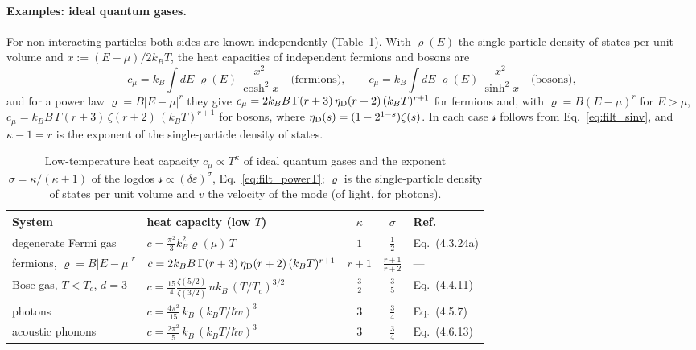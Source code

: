 \documentclass[10pt,a4paper]{article}
\theoremstyle{plain}
\newcommand{\lndos}{{logdos}}  %
\newcommand{\lds}{\mathscr{s}}  %
\newcommand{\etaD}{\eta_{\rm D}}  %
\begin{document}
\paragraph{Examples: ideal quantum gases.} For non-interacting particles
both sides are known independently (Table~\ref{tab:gases}). With
$\varrho(E)$ the single-particle density of states per unit volume and
$x:=(E-\mu)/2k_BT$, the heat capacities of independent fermions and bosons
are
\begin{equation}\label{eq:filt_cF}
  c_\mu=k_B\int dE\;\varrho(E)\,\frac{x^{2}}{\cosh^{2}x}
  \quad\text{(fermions)},
  \qquad
  c_\mu=k_B\int dE\;\varrho(E)\,\frac{x^{2}}{\sinh^{2}x}
  \quad\text{(bosons)},
\end{equation}
and for a power law $\varrho=B|E-\mu|^{r}$ they give
$c_\mu=2k_BB\,\Gamma(r+3)\,\etaD(r+2)\,(k_BT)^{r+1}$ for fermions and, with
$\varrho=B(E-\mu)^{r}$ for $E>\mu$,
$c_\mu=k_BB\,\Gamma(r+3)\,\zeta(r+2)\,(k_BT)^{r+1}$ for bosons, where
$\etaD(s)=(1-2^{1-s})\zeta(s)$. In each case $\lds$ follows from
Eq.~\eqref{eq:filt_sinv}, and $\kappa-1=r$ is the exponent of the
single-particle density of states.
\begin{table}[htbp]
\centering
\small
\caption{Low-temperature heat capacity $c_\mu\propto T^{\kappa}$ of ideal
quantum gases and the exponent $\sigma=\kappa/(\kappa+1)$ of the \lndos{}
$\lds\propto(\delta\varepsilon)^{\sigma}$, Eq.~\eqref{eq:filt_powerT};
$\varrho$ is the single-particle density of states per unit volume and $v$
the velocity of the mode (of light, for photons).}
\label{tab:gases}
\begin{tabular}{llccl}
\toprule
System & heat capacity (low $T$) & $\kappa$ & $\sigma$ & Ref.~\cite{Schwabl} \\
\midrule
degenerate Fermi gas & $c=\tfrac{\pi^{2}}{3}k_B^{2}\varrho(\mu)\,T$ & $1$ & $\tfrac12$ & Eq.~(4.3.24a) \\[2pt]
fermions, $\varrho=B|E-\mu|^{r}$ & $c=2k_BB\,\Gamma(r+3)\,\etaD(r+2)\,(k_BT)^{r+1}$ & $r+1$ & $\tfrac{r+1}{r+2}$ & --- \\[2pt]
Bose gas, $T<T_c$, $d=3$ & $c=\tfrac{15}{4}\tfrac{\zeta(5/2)}{\zeta(3/2)}\,nk_B\,(T/T_c)^{3/2}$ & $\tfrac32$ & $\tfrac35$ & Eq.~(4.4.11) \\[2pt]
photons & $c=\tfrac{4\pi^{2}}{15}\,k_B\,(k_BT/\hbar v)^{3}$ & $3$ & $\tfrac34$ & Eq.~(4.5.7) \\[2pt]
acoustic phonons & $c=\tfrac{2\pi^{2}}{5}\,k_B\,(k_BT/\hbar v)^{3}$ & $3$ & $\tfrac34$ & Eq.~(4.6.13) \\
\bottomrule
\end{tabular}
\end{table}
\end{document}
